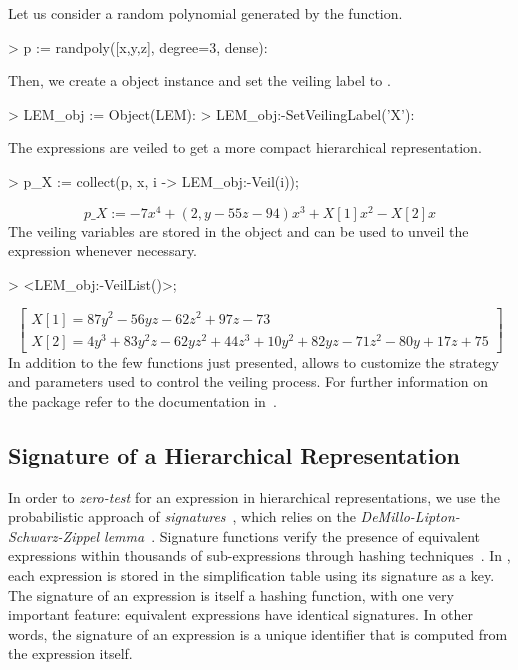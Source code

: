 \begin{example}
  Let us consider a random polynomial  generated by the  function.
  \begin{mapleinline}
> p := randpoly([x,y,z], degree=3, dense):
  \end{mapleinline}
  Then, we create a \LEM{} object instance and set the veiling label to .
  \begin{mapleinline}
> LEM_obj := Object(LEM):
> LEM_obj:-SetVeilingLabel('X'):
  \end{mapleinline}
  The expressions are veiled to get a more compact hierarchical representation.
  \begin{mapleinline}
> p_X := collect(p, x, i -> LEM_obj:-Veil(i));
  \end{mapleinline}
  \begin{equation*}
    p\_X := -7x^4 + (2,y - 55z - 94)x^3 + X[1]x^2 - X[2]x
  \end{equation*}
  The veiling variables are stored in the \LEM{} object and can be used to unveil the expression whenever necessary.
  \begin{mapleinline}
> <LEM_obj:-VeilList()>;
  \end{mapleinline}
  \begin{equation*}
    \begin{bmatrix}
      X[1] = 87y^2 - 56yz - 62z^2 + 97z - 73 \\[0.2em]
      X[2] = 4y^3 + 83y^2z - 62yz^2 + 44z^3 + 10y^2 + 82yz - 71z^2 - 80y + 17z + 75
    \end{bmatrix}
  \end{equation*}
  In addition to the few functions just presented, \LEM{} allows to customize the strategy and parameters used to control the veiling process. For further information on the \LEM{} package refer to the documentation in~\cite{lem}.
\end{example}

\subsection{Signature of a Hierarchical Representation}
\label{chap2:sec:signature}

In order to \emph{zero-test} for an expression in hierarchical representations, we use the probabilistic approach of \emph{signatures}~\cite{geddes1992algorithms}, which relies on the \emph{DeMillo-Lipton-Schwarz-Zippel lemma}~\cite{demillo1978probabilistic, schwartz1980fast, zippel1979probabilistic}. Signature functions verify the presence of equivalent expressions within thousands of sub-expressions through hashing techniques~\cite{char1984design, gonnet1984determining, gonnet1986results, monagan1994signature}. In \Maple{}, each expression is stored in the simplification table using its signature as a key. The signature of an expression is itself a hashing function, with one very important feature: equivalent expressions have identical signatures. In other words, the signature of an expression is a unique identifier that is computed from the expression itself.

